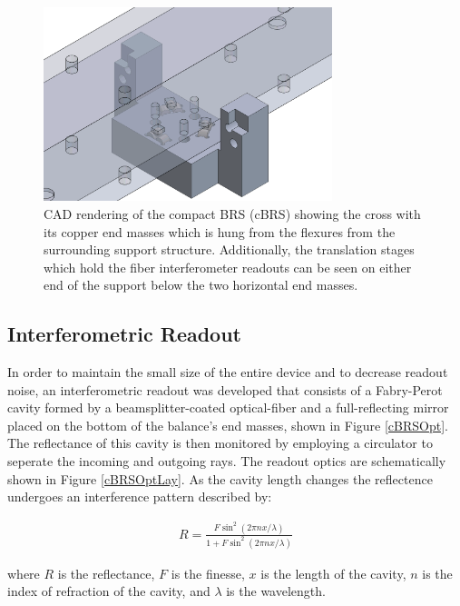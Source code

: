 \documentclass [12pt, proquest]{uwthesis}[2019]
\begin{document}
\begin{figure}[!h]
\begin{center}
\includegraphics[width=0.75\textwidth]{cBRSKMount.png}
\end{center}
\caption[CAD rendering of the cBRS kinematic mount]{CAD rendering of the compact BRS (cBRS) showing the cross with its copper end masses which is hung from the flexures from the surrounding support structure. Additionally, the translation stages which hold the fiber interferometer readouts can be seen on either end of the support below the two horizontal end masses.}\label{kmount}
\end{figure}

\subsection{Interferometric Readout}
In order to maintain the small size of the entire device and to decrease readout noise, an interferometric readout was developed that consists of a Fabry-Perot cavity formed by a beamsplitter-coated optical-fiber and a full-reflecting mirror placed on the bottom of the balance's end masses, shown in Figure \ref{cBRSOpt}. The reflectance of this cavity is then monitored by employing a circulator to seperate the incoming and outgoing rays. The readout optics are schematically shown in Figure \ref{cBRSOptLay}. As the cavity length changes the reflectence undergoes an interference pattern described by:

\begin{align}
R=\frac{F \sin^2(2\pi n x/\lambda)}{1+F \sin^2(2\pi n x/\lambda)}
\end{align}

where $R$ is the reflectance, $F$ is the finesse, $x$ is the length of the cavity, $n$ is the index of refraction of the cavity, and $\lambda$ is the wavelength.
\end{document}
